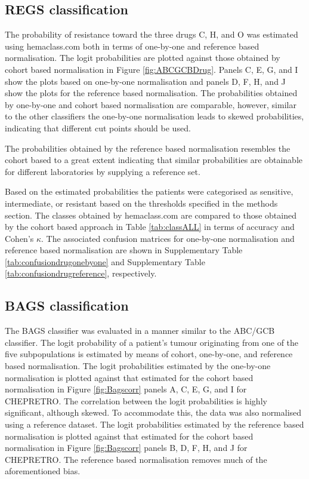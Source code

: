 \documentclass[10pt]{bmc_article}
\newenvironment{bmcformat}{\fussy\setboolean{publ}{true}}{\fussy}
\begin{document}
\begin{bmcformat}
\subsection*{REGS classification}

The probability of resistance toward the three drugs C, H, and O was estimated using hemaclass.com both in terms of one-by-one and reference based normalisation. The logit probabilities are plotted against those obtained by cohort based normalisation in Figure \ref{fig:ABCGCBDrug}. Panels C, E, G, and I show the plots based on one-by-one normalisation and panels D, F, H, and J show the plots for the reference based normalisation. The probabilities obtained by one-by-one and cohort based normalisation are comparable, however, similar to the other classifiers the one-by-one normalisation leads to skewed probabilities, indicating that different cut points should be used.

The probabilities obtained by the reference based normalisation resembles the cohort based to a great extent indicating that similar probabilities are obtainable for different laboratories by supplying a reference set.

Based on the estimated probabilities the patients were categorised as sensitive, intermediate, or resistant based on the thresholds specified in the methods section. The classes obtained by hemaclass.com are compared to those obtained by the cohort based approach in Table \ref{tab:classALL} in terms of accuracy and Cohen's $\kappa$.  The associated confusion matrices for one-by-one normalisation and reference based normalisation are shown in Supplementary Table \ref{tab:confusiondrugonebyone} and Supplementary Table \ref{tab:confusiondrugreference}, respectively.

\subsection*{BAGS classification}

The BAGS classifier was evaluated in a manner similar to the ABC/GCB classifier. The logit probability of a patient's tumour originating from one of the five subpopulations is estimated by means of cohort, one-by-one, and reference based normalisation. The logit probabilities estimated by the one-by-one normalisation is plotted against that estimated for the cohort based normalisation in Figure \ref{fig:Bagscorr} panels A, C, E, G, and I for CHEPRETRO. The correlation between the logit probabilities is highly significant, although skewed. To accommodate this, the data was also normalised using a reference dataset. The logit probabilities estimated by the reference based normalisation is plotted against that estimated for the cohort based normalisation in Figure \ref{fig:Bagscorr} panels B, D, F, H, and J for CHEPRETRO. The reference based normalisation removes much of the aforementioned bias.


\end{bmcformat}
\end{document}
